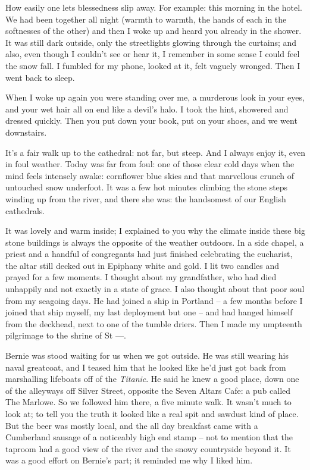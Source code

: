 \documentclass{amsbook}
\begin{document}
    How easily one lets blessedness slip away. For example: this morning in the hotel. We had been together all night (warmth to warmth, the hands of each in the softnesses of the other) and then I woke up and heard you already in the shower. It was still dark outside, only the streetlights glowing through the curtains; and also, even though I couldn't see or hear it, I remember in some sense I could feel the snow fall. I fumbled for my phone, looked at it, felt vaguely wronged. Then I went back to sleep.

When I woke up again you were standing over me, a murderous look in your eyes, and your wet hair all on end like a devil's halo. I took the hint, showered and dressed quickly. Then you put down your book, put on your shoes, and we went downstairs.

It's a fair walk up to the cathedral: not far, but steep. And I always enjoy it, even in foul weather. Today was far from foul: one of those clear cold days when the mind feels intensely awake: cornflower blue skies and that marvellous crunch of untouched snow underfoot. It was a few hot minutes climbing the stone steps winding up from the river, and there she was: the handsomest of our English cathedrals.

It was lovely and warm inside; I explained to you why the climate inside these big stone buildings is always the opposite of the weather outdoors. In a side chapel, a priest and a handful of congregants had just finished celebrating the eucharist, the altar still decked out in Epiphany white and gold. I lit two candles and prayed for a few moments. I thought about my grandfather, who had died unhappily and not exactly in a state of grace. I also thought about that poor soul from my seagoing days. He had joined a ship in Portland -- a few months before I joined that ship myself, my last deployment but one -- and had hanged himself from the deckhead, next to one of the tumble driers. Then I made my umpteenth pilgrimage to the shrine of St ---.

Bernie was stood waiting for us when we got outside. He was still wearing his naval greatcoat, and I teased him that he looked like he'd just got back from marshalling lifeboats off of the \textit{Titanic}. He said he knew a good place, down one of the alleyways off Silver Street, opposite the Seven Altars Cafe: a pub called The Marlowe. So we followed him there, a five minute walk. It wasn't much to look at; to tell you the truth it looked like a real spit and sawdust kind of place. But the beer was mostly local, and the all day breakfast came with a Cumberland sausage of a noticeably high end stamp -- not to mention that the taproom had a good view of the river and the snowy countryside beyond it. It was a good effort on Bernie's part; it reminded me why I liked him.
\end{document}
